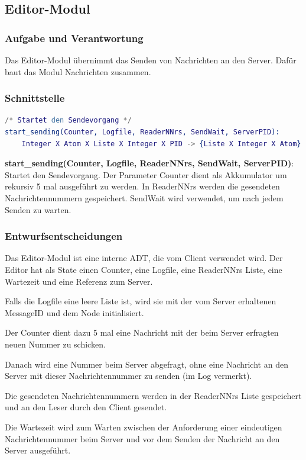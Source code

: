 \documentclass{article}
\begin{document}
\newpage

\subsection{Editor-Modul}
\subsubsection{Aufgabe und Verantwortung}
Das Editor-Modul übernimmt das Senden von Nachrichten an den Server. Dafür baut das Modul Nachrichten zusammen.

\subsubsection{Schnittstelle}
\begin{lstlisting}[language=Erlang]
/* Startet den Sendevorgang */
start_sending(Counter, Logfile, ReaderNNrs, SendWait, ServerPID):
    Integer X Atom X Liste X Integer X PID -> {Liste X Integer X Atom}
\end{lstlisting}

\textbf{start\_sending(Counter, Logfile, ReaderNNrs, SendWait, ServerPID)}: Startet den Sendevorgang. Der Parameter Counter dient
als Akkumulator um rekursiv 5 mal ausgeführt zu werden. In ReaderNNrs werden die gesendeten Nachrichtennummern
gespeichert. SendWait wird verwendet, um nach jedem Senden zu warten.\\

\subsubsection{Entwurfsentscheidungen}
Das Editor-Modul ist eine interne ADT, die vom Client verwendet wird.
Der Editor hat als State einen Counter, eine Logfile, eine ReaderNNrs Liste, eine Wartezeit und eine Referenz zum Server.

Falls die Logfile eine leere Liste ist, wird sie mit der vom Server erhaltenen MessageID und dem Node initialisiert.

Der Counter dient dazu 5 mal eine Nachricht mit der beim Server erfragten neuen Nummer zu schicken.

Danach wird eine Nummer beim Server abgefragt, ohne eine Nachricht an den Server mit dieser Nachrichtennummer zu senden
(im Log vermerkt).

Die gesendeten Nachrichtennummern werden in der ReaderNNrs Liste gespeichert und an den Leser durch den Client gesendet.

Die Wartezeit wird zum Warten zwischen der Anforderung einer eindeutigen Nachrichtennummer beim Server und vor dem
Senden der Nachricht an den Server ausgeführt.
\end{document}
